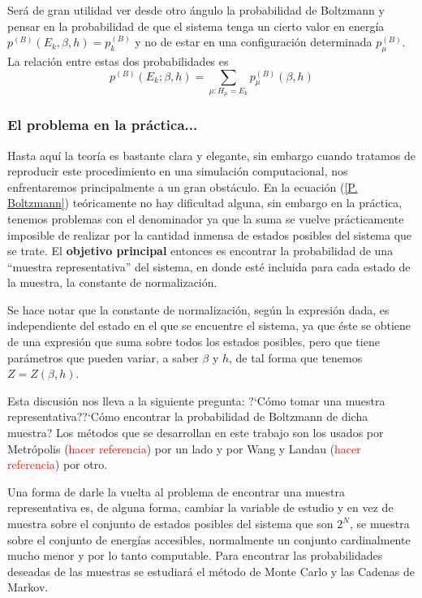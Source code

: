 \documentclass[12pt]{book}
\begin{document}
Será de gran utilidad ver desde otro ángulo la probabilidad de Boltzmann y pensar en la probabilidad de que el sistema tenga un cierto valor en energía $p^{(B)}(E_{k},\beta,h)=p^{(B)}_{k}$ y no de estar en una  configuración determinada $p_{\mu}^{(B)}$. La relación entre estas dos probabilidades  es
\begin{equation}
p^{(B)}(E_{k};\beta,h) =\sum_{\mu:H_{\mu}=E_{k}} p_{\mu}^{(B)}(\beta,h)
\end{equation}


\subsubsection{El problema en la práctica...}

Hasta aquí la teoría es bastante clara y elegante, sin embargo cuando tratamos de reproducir este procedimiento en una simulación computacional, nos enfrentaremos principalmente a un gran obstáculo. En la ecuación (\ref{P. Boltzmann}) teóricamente no hay dificultad alguna, sin embargo en la práctica, tenemos problemas con el denominador ya que la suma se vuelve prácticamente imposible de realizar por la cantidad inmensa de estados posibles del sistema que se trate. El \textbf{objetivo principal} entonces es encontrar la probabilidad de una ``muestra representativa'' del sistema, en donde esté incluida para cada estado de la muestra, la constante de normalización. 

Se hace notar que la constante de normalización, según la expresión dada, es independiente del estado en el que se encuentre el sistema, ya que éste se obtiene de una expresión que suma sobre todos los estados posibles, pero que tiene parámetros que pueden variar, a saber $\beta$ y $h$, de tal forma que tenemos $Z=Z(\beta, h)$.

Esta discusión nos lleva a la siguiente pregunta: ?`Cómo tomar una muestra representativa??`Cómo encontrar la probabilidad de Boltzmann de dicha muestra? Los métodos que se desarrollan en este trabajo son los usados por Metrópolis (\textcolor{red}{hacer referencia}) por un lado y por Wang y Landau (\textcolor{red}{hacer referencia}) por otro.

Una forma de darle la vuelta al problema de encontrar una muestra representativa es, de alguna forma, cambiar la variable de estudio y en vez de muestra sobre el conjunto de estados posibles del sistema  que son $2^{N}$, se muestra sobre el conjunto de energías accesibles, normalmente un conjunto cardinalmente mucho menor y por lo tanto computable. Para encontrar las probabilidades deseadas de las muestras se estudiará el método de Monte Carlo y las Cadenas de Markov.
\\
\end{document}
